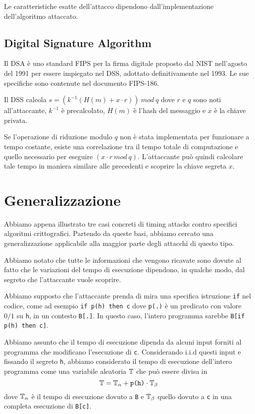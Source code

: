 		Le caratteristiche esatte dell'attacco dipendono dall'implementazione dell'algoritmo attaccato.
		
		\subsection{Digital Signature Algorithm}
		Il \ac{DSA} è uno standard \ac{FIPS} per la firma digitale proposto dal \ac{NIST} nell'agosto del 1991 per essere impiegato nel \ac{DSS}, adottato definitivamente nel 1993. Le sue specifiche sono contenute nel documento \ac{FIPS}-186\cite{kravitz1993digital}.
		
		Il \ac{DSS} calcola $s = (k^{-1}(H(m) + x \cdot r)) \ mod \ q$ dove $r$ e $q$ sono noti all'attaccante, $k^{-1}$ è precalcolato, $H(m)$ è l'hash del messaggio e $x$ è la chiave privata.
		
		Se l'operazione di riduzione modulo $q$ non è stata implementata per funzionare a tempo costante, esiste una correlazione tra il tempo totale di computazione e quello necessario per eseguire $(x \cdot r \ mod \ q)$. L'attaccante può quindi calcolare tale tempo in maniera similare alle precedenti e scoprire la chiave segreta $x$.
		
	\section{Generalizzazione}
	Abbiamo appena illustrato tre casi concreti di timing attacks contro specifici algoritmi crittografici. Partendo da queste basi, abbiamo cercato una generalizzazione applicabile alla maggior parte degli attacchi di questo tipo.
	
	Abbiamo notato che tutte le informazioni che vengono ricavate sono dovute al fatto che le variazioni del tempo di esecuzione dipendono, in qualche modo, dal segreto che l'attaccante vuole scoprire.
	
	Abbiamo supposto che l'attaccante prenda di mira una specifica istruzione \texttt{if} nel codice, come ad esempio \texttt{if p(h) then c} dove \texttt{p(.)} è un predicato con valore $0/1$ su \texttt{h}, in un contesto \texttt{B[.]}. In questo caso, l'intero programma sarebbe \texttt{B[if p(h) then c]}.
	
	Abbiamo assunto che il tempo di esecuzione dipenda da alcuni input forniti al programma che modificano l'esecuzione di \texttt{c}. Considerando i.i.d questi input e fissando il segreto \texttt{h}, abbiamo considerato il tempo di esecuzione dell'intero programma come una variabile aleatoria $\mathbb{T}$ che può essere divisa in \begin{equation} \label{eq:1}
		\mathbb{T} = \mathbb{T}_{\alpha} + \text{\texttt{p(h)}}\cdot \mathbb{T}_{\beta}
	\end{equation} 
	dove $\mathbb{T}_{\alpha}$ è il tempo di esecuzione dovuto a \texttt{B} e $\mathbb{T}_{\beta}$ quello dovuto a \texttt{c} in una completa esecuzione di \texttt{B[c]}.
	

